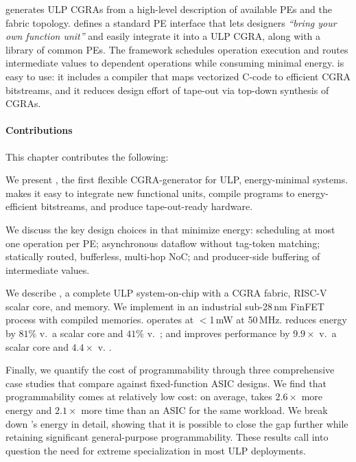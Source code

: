 \snafuframe generates ULP CGRAs from a high-level description of available PEs and the fabric topology.
%
\snafuframe defines a standard PE interface that lets designers \emph{``bring your own function unit''}
and easily integrate it into a ULP CGRA,
along with a library of common PEs.
%
The \snafuframe framework schedules operation execution and routes intermediate values to dependent operations
while consuming minimal energy.
%
\snafuframe is easy to use:
it includes a compiler that maps vectorized C-code to efficient CGRA bitstreams,
and it reduces design effort of tape-out via top-down synthesis of CGRAs.

\figSNAFUIntro

\paragraph{Contributions} This chapter contributes the following:
\begin{compactitem}
\item We present \snafuframe, the first flexible CGRA-generator for ULP, energy-minimal systems.
  \snafuframe makes it easy to integrate new functional units,
  compile programs to energy-efficient bitstreams,
  and produce tape-out-ready hardware.
  
\item We discuss the key design choices in \snafuframe that minimize energy:
  scheduling at most one operation per PE;
  asynchronous dataflow without tag-token matching;
  statically routed, bufferless, multi-hop NoC;
  and producer-side buffering of intermediate values.
  
\item We describe \snafuarch, a complete ULP system-on-chip with a CGRA fabric,
  RISC-V scalar core, and memory.
  We implement \snafuarch in an industrial sub-28\,nm FinFET process with compiled memories.
  \snafuarch operates at $<$1\,mW at 50\,MHz.
  \snafuarch reduces energy by $81\%$ v.\ a scalar core
  and $41\%$ v.\ \manic;
  and improves performance by $9.9\times$ v.\ a scalar core
  and $4.4\times$ v. \manic.

\item Finally, we quantify the cost of programmability through three
  comprehensive case studies that compare \snafuarch against
  fixed-function ASIC designs. We find that programmability comes at
  relatively low cost: on average, \snafuarch takes $2.6\times$ more
  energy and $2.1\times$ more time than an ASIC for the same
  workload. We break down \snafuarch's energy in detail, showing that it
  is possible to close the gap further while retaining significant
  general-purpose programmability. These results call into
  question the need for extreme specialization in most ULP
  deployments.
  
\end{compactitem}